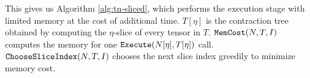 This gives us Algorithm \ref{alg:tn-sliced}, which performs the execution stage with limited memory at the cost of additional time. $T[\eta]$ is the contraction tree obtained by computing the $\eta$-slice of every tensor in $T$. $\texttt{\upshape MemCost}(N, T, I)$ computes the memory for one $\texttt{\upshape Execute}(N[\eta], T[\eta])$ call. $\texttt{\upshape ChooseSliceIndex}(N,T,I)$ chooses the next slice index greedily to minimize memory cost.

